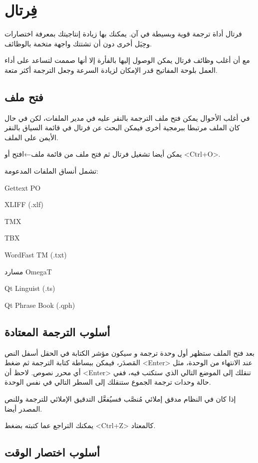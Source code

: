 \section{فِرتال}
فرتال أداة ترجمة قوية وبسيطة في آن. يمكنك بها زيادة إنتاجيتك بمعرفة
اختصارات وحِيَل أخرى دون أن تشتتك واجهة متخمة بالوظائف.

مع أن أغلب وظائف فرتال يمكن الوصول إليها بالفأرة إلا أنها صممت لتساعد
على أداء العمل بلوحة المفاتيح قدر الإمكان لزيادة السرعة وجعل الترجمة
أكثر متعة.

\subsection{فتح ملف}
في أغلب الأحوال يمكن فتح ملف الترجمة بالنقر عليه في مدير الملفات، لكن في
حال كان الملف مرتبطا ببرمجية أخرى فيمكن البحث عن فرتال في قائمة السياق
بالنقر الأيمن على الملف.

يمكن أيضا تشغيل فرتال ثم فتح ملف من قائمة ملف←افتح أو <Ctrl+O>.

تشمل أنساق الملفات المدعومة:

\startitemize[1]
\item Gettext PO
\item {\sc XLIFF} (.xlf)
\item {\sc TMX}
\item {\sc TBX}
\item WordFast TM (.txt)
\item مسارد OmegaT
\item Qt Linguist (.ts)
\item Qt Phrase Book (.qph)
\stopitemize
\subsection{أسلوب الترجمة المعتادة}
بعد فتح الملف ستظهر أول وحدة ترجمة و سيكون مؤشر الكتابة في الحقل أسفل
النص المَصدَر، فيمكن ببساطة كتابة الترجمة ثم ضغط <Enter> عند الانتهاء
من الوحدة، مثل أي محرر نصوص. لاحظ أن <Enter> تنقلك إلى الموضع التالي
الذي ستكتب فيه، ففي حالة وحدات ترجمة الجموع ستنقلك إلى السطر التالي في
نفس الوحدة.

إذا كان في النظام مدقق إملائي مُنصَّب فسيُفعَّل التدقيق الإملائي للترجمة
وللنص المصدر أيضا.

يمكنك التراجع عما كتبته بضغط <Ctrl+Z> كالمعتاد.

\subsection{أسلوب اختصار الوقت}
